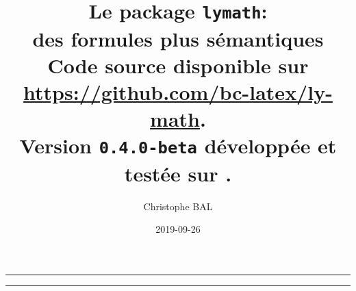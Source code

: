 \documentclass[12pt,a4paper]{article}
\begin{document}
\renewcommand\labelitemi{\raisebox{0.125em}{\tiny\textbullet}}
\renewcommand{\labelitemii}{---}

\title{%
	Le package \texttt{lymath}:\\%
	des formules plus sémantiques\\%
	{\footnotesize Code source disponible sur \url{https://github.com/bc-latex/ly-math}.}\\%
{\footnotesize Version \texttt{0.4.0-beta} développée et testée sur \macosxname{}.}%
}
\author{Christophe BAL}
\date{2019-09-26}

\maketitle


\vspace{2em}

\hrule

\tableofcontents

\vspace{1.5em}

\hrule

\newpage

\end{document}
